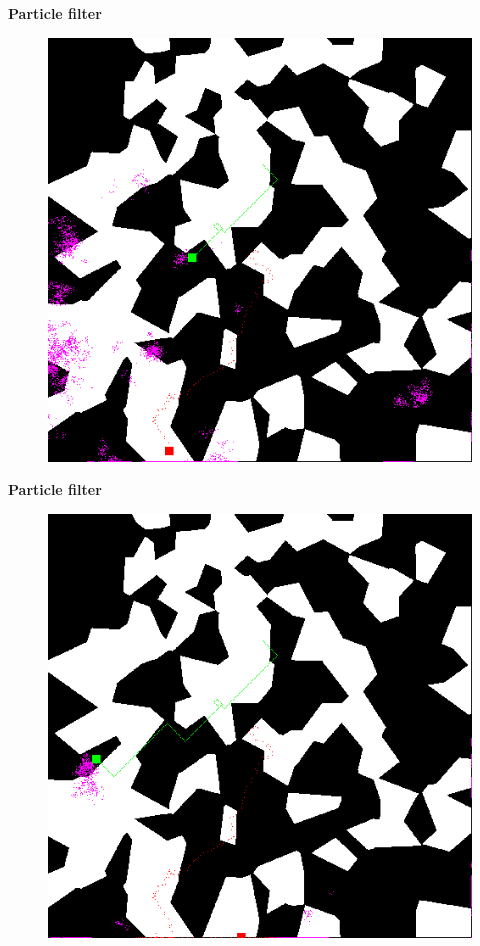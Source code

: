 \documentclass[xcolor=dvipsnames]{beamer}
\begin{document}
\begin{frame}{\bf Particle filter}

\begin{figure}[htbp]
  \centering
   \includegraphics[scale=0.4]{../pictures/00110.png}
\end{figure}

\end{frame}

\begin{frame}{\bf Particle filter}

\begin{figure}[htbp]
  \centering
   \includegraphics[scale=0.4]{../pictures/00200.png}
\end{figure}

\end{frame}
\end{document}
